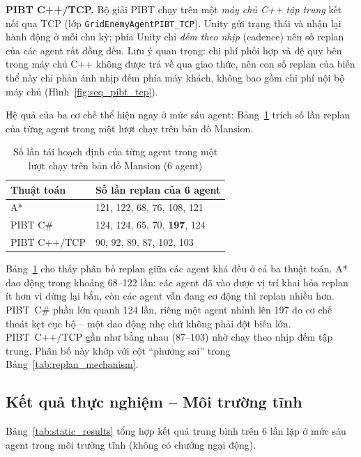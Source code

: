 \documentclass[../DoAn.tex]{subfiles}
\begin{document}
\textbf{PIBT C++/TCP.} Bộ giải PIBT chạy trên một \emph{máy chủ C++ tập trung} kết nối qua TCP
(lớp \texttt{GridEnemyAgentPIBT\_TCP}). Unity gửi trạng thái và nhận lại hành động ở mỗi chu kỳ;
phía Unity chỉ \emph{đếm theo nhịp} (cadence) nên số replan của các agent rất đồng đều. Lưu ý quan
trọng: chi phí phối hợp và đệ quy bên trong máy chủ C++ không được trả về qua giao thức, nên con
số replan của biến thể này chỉ phản ánh nhịp đếm phía máy khách, không bao gồm chi phí nội bộ máy
chủ (Hình~\ref{fig:seq_pibt_tcp}).

Hệ quả của ba cơ chế thể hiện ngay ở mức sáu agent: Bảng~\ref{tab:peragent_evidence} trích số lần
replan của từng agent trong một lượt chạy trên bản đồ Mansion.

\begin{table}[htbp]
\centering
\caption{Số lần tái hoạch định của từng agent trong một lượt chạy trên bản đồ Mansion (6 agent)}
\label{tab:peragent_evidence}
\small
\begin{tabular}{ll}
\hline
\textbf{Thuật toán} & \textbf{Số lần replan của 6 agent} \\ \hline
A*           & 121, 122, 68, 76, 108, 121 \\
PIBT C\#     & 124, 124, 65, 70, \textbf{197}, 124 \\
PIBT C++/TCP & 90, 92, 89, 87, 102, 103 \\ \hline
\end{tabular}
\end{table}

Bảng~\ref{tab:peragent_evidence} cho thấy phân bố replan giữa các agent khá đều ở cả ba thuật
toán. A* dao động trong khoảng 68--122 lần: các agent đã vào được vị trí khai hỏa replan ít hơn
vì dừng lại bắn, còn các agent vẫn đang cơ động thì replan nhiều hơn. PIBT~C\# phần lớn quanh 124
lần, riêng một agent nhỉnh lên 197 do cơ chế thoát kẹt cục bộ -- một dao động nhẹ chứ không phải
đột biến lớn. PIBT~C++/TCP gần như bằng
nhau (87--103) nhờ chạy theo nhịp đếm tập trung. Phân bố này khớp với cột ``phương sai'' trong
Bảng~\ref{tab:replan_mechanism}.

\subsection{Kết quả thực nghiệm -- Môi trường tĩnh}

Bảng~\ref{tab:static_results} tổng hợp kết quả trung bình trên 6 lần lặp ở mức sáu agent trong
môi trường tĩnh (không có chướng ngại động).
\end{document}
